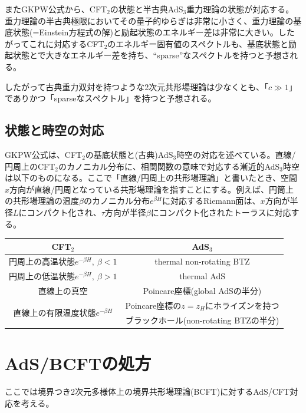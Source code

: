 またGKPW公式から、CFT$_2$の状態と半古典AdS$_3$重力理論の状態が対応する。重力理論の半古典極限においてその量子的ゆらぎは非常に小さく、重力理論の基底状態(=Einstein方程式の解)と励起状態のエネルギー差は非常に大きい。したがってこれに対応するCFT$_2$のエネルギー固有値のスペクトルも、基底状態と励起状態とで大きなエネルギー差を持ち、``sparse''なスペクトルを持つと予想される。

したがって古典重力双対を持つような2次元共形場理論は少なくとも、「$c\gg 1$」でありかつ「sparseなスペクトル」を持つと予想される。

\subsection{状態と時空の対応}
GKPW公式は、CFT$_2$の基底状態と(古典)AdS$_3$時空の対応を述べている。直線/円周上のCFT$_2$のカノニカル分布に、相関関数の意味で対応する漸近的AdS$_3$時空は以下のものになる。ここで「直線/円周上の共形場理論」と書いたとき、空間$x$方向が直線/円周となっている共形場理論を指すことにする。例えば、円筒上の共形場理論の温度$\beta$のカノニカル分布$e^{\beta H}$に対応するRiemann面は、$x$方向が半径$L$にコンパクト化され、$\tau$方向が半径$\beta$にコンパクト化されたトーラスに対応する。
\begin{table}[H]
	\centering
	\begin{tabular}{|c|c|}\hline
		CFT$_2$ & AdS$_3$ \\ \hline
		円周上の高温状態$e^{-\beta H},\ \beta<1$ & thermal non-rotating BTZ \\\hline
		円周上の低温状態$e^{-\beta H},\ \beta>1$ & thermal AdS \\\hline
		直線上の真空 & Poincare座標(global AdSの半分) \\\hline
		\multirow{2}{*}{直線上の有限温度状態$e^{-\beta H}$} & Poincare座標の$z=z_H$にホライズンを持つ\\
		& ブラックホール(non-rotating BTZの半分) \\ \hline
	\end{tabular}
\end{table}

\section{AdS/BCFTの処方}\label{sec:adsbcft}
ここでは境界つき2次元多様体上の境界共形場理論(BCFT)に対するAdS/CFT対応を考える。

